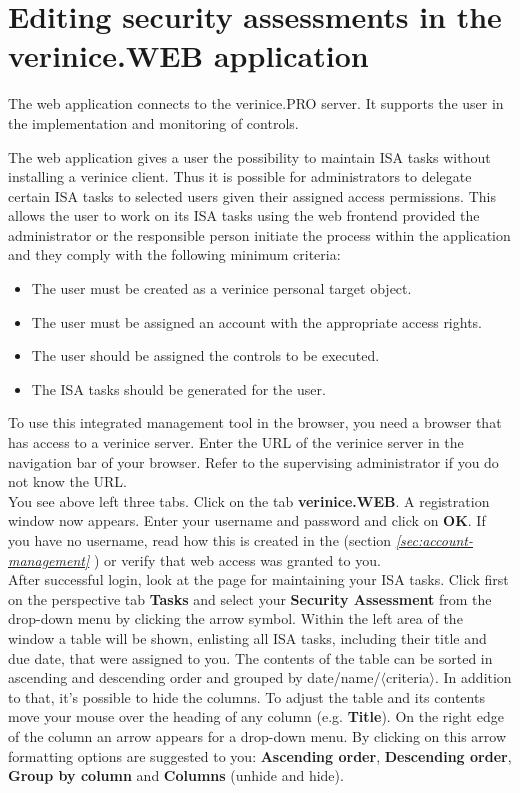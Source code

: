 \documentclass[a4paper,10pt]{book}
\begin{document}
\section[Editing security assessments in the verinice.WEB
frontend]{Editing security assessments in the verinice.WEB
  application}
\label{sec:security-assessments-web-frontend}

The web application connects to the verinice.\textsc{PRO} server. It
supports the user in the implementation and monitoring of controls.

The web application gives a user the possibility to maintain ISA tasks
without installing a verinice client.  Thus it is possible for
administrators to delegate certain ISA tasks to selected users given
their assigned access permissions.  This allows the user to work on
its ISA tasks using the web frontend provided the administrator or the
responsible person initiate the process within the application and
they comply with the following minimum criteria:
\begin{itemize}
 \item The user must be created as a verinice personal target object.
 \item The user must be assigned an account with the appropriate
   access rights.
 \item The user should be assigned the controls to be executed.
 \item The ISA tasks should be generated for the user.
\end{itemize}
To use this integrated management tool in the browser, you need a
browser that has access to a verinice server. Enter the URL of the
verinice server in the navigation bar of your browser. Refer to the
supervising administrator if you do not know the URL.
\newline\\
You see above left three tabs. Click on the tab
\textbf{verinice.\textsc{WEB}}. A registration window now
appears. Enter your username and password and click on \textbf{OK}.
If you have no username, read how this is created in the (section {\em
  \ref{sec:account-management} }) or
verify that web access was granted to you.
\newline\\
After successful login, look at the page for maintaining your ISA
tasks. Click first on the perspective tab \textbf{Tasks} and select
your \textbf{Security Assessment} from the drop-down menu by clicking
the arrow symbol. Within the left area of the window a table will be
shown, enlisting all ISA tasks, including their title and due date,
that were assigned to you. The contents of the table can be sorted in
ascending and descending order and grouped by
date/name/$\langle$criteria$\rangle$. In addition to that, it's
possible to hide the columns.  To adjust the table and its contents
move your mouse over the heading of any column
(e.g. \textbf{Title}). On the right edge of the column an arrow
appears for a drop-down menu. By clicking on this arrow formatting
options are suggested to you: \textbf{Ascending order},
\textbf{Descending order}, \textbf{Group by column} and
\textbf{Columns} (unhide and hide).
\end{document}
